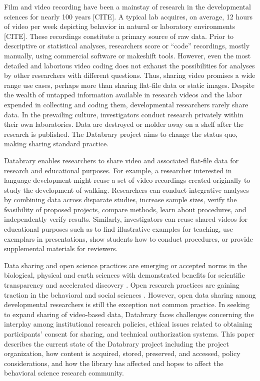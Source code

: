 \documentclass{sig-alternate}
\begin{document}
Film and video recording have been a mainstay of research in the
developmental sciences for nearly 100 years [CITE]. A typical lab
acquires, on average, 12 hours of video per week depicting behavior in
natural or laboratory environments [CITE]. These recordings constitute a
primary source of raw data. Prior to descriptive or statistical
analyses, researchers score or “code” recordings, mostly manually, using
commercial software or makeshift tools. However, even the most detailed
and laborious video coding does not exhaust the possibilities for
analyses by other researchers with different questions. Thus, sharing
video promises a wide range use cases, perhaps more than sharing
flat-file data or static images. Despite the wealth of untapped
information available in research videos and the labor expended in
collecting and coding them, developmental researchers rarely share data.
In the prevailing culture, investigators conduct research privately
within their own laboratories. Data are destroyed or molder away on a
shelf after the research is published. The Databrary project aims to
change the status quo, making sharing standard practice.

Databrary enables researchers to share video and associated flat-file
data for research and educational purposes. For example, a researcher
interested in language development might reuse a set of video recordings
created originally to study the development of walking. Researchers can
conduct integrative analyses by combining data across disparate studies,
increase sample sizes, verify the feasibility of proposed projects,
compare methods, learn about procedures, and independently verify
results. Similarly, investigators can reuse shared videos for
educational purposes such as to find illustrative examples for teaching,
use exemplars in presentations, show students how to conduct procedures,
or provide supplemental materials for reviewers.

Data sharing and open science practices are emerging or accepted norms
in the biological, physical and earth sciences with demonstrated
benefits for scientific transparency and accelerated discovery \cite{Curry2011,iedadata,Kaye2009,Overpeck2011}.
Open research practices are gaining traction in the behavioral and
social sciences \cite{Lunshof2014,Adolph2012,King2011,APS2012,Nosek2012i,Nosek2012ii}. However, open data sharing among developmental
researchers is still the exception \cite{MacWhinney2001} not common practice. In seeking
to expand sharing of video-based data, Databrary faces challenges
concerning the interplay among institutional research policies, ethical
issues related to obtaining participants’ consent for sharing, and
technical authorization systems. This paper describes the current state
of the Databrary project including the project organization, how content
is acquired, stored, preserved, and accessed, policy considerations, and
how the library has affected and hopes to affect the behavioral science
research community.
\end{document}
